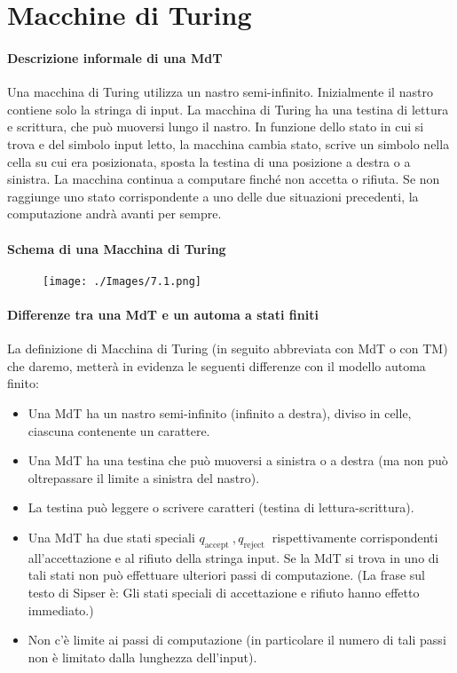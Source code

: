 \chapter{Macchine di Turing}

\subsubsection{Descrizione informale di una MdT}

Una macchina di Turing utilizza un nastro semi-infinito. Inizialmente il nastro contiene solo la stringa di input.
La macchina di Turing ha una testina di lettura e scrittura,
che può muoversi lungo il nastro.
In funzione dello stato in cui si trova e del simbolo input letto,
la macchina cambia stato, scrive un simbolo nella cella su cui
era posizionata, sposta la testina di una posizione a destra o a
sinistra.
La macchina continua a computare finché non accetta o
rifiuta.
Se non raggiunge uno stato corrispondente a uno delle due
situazioni precedenti, la computazione andrà avanti per
sempre.

\subsubsection{Schema di una Macchina di Turing}

\begin{figure}[hbpt!]
    \centering
    \texttt{[image: ./Images/7.1.png]}
\end{figure}
\FloatBarrier

\subsubsection{Differenze tra una MdT e un automa a stati finiti}
La definizione di Macchina di Turing (in seguito abbreviata con MdT o con TM) che daremo, metterà in evidenza le seguenti differenze con il modello automa finito:
\begin{itemize}
    \item  Una MdT ha un nastro semi-infinito (infinito a destra), diviso in celle, ciascuna contenente un carattere.
    \item Una MdT ha una testina che può muoversi a sinistra o a destra (ma non può oltrepassare il limite a sinistra del nastro).
    \item La testina può leggere o scrivere caratteri (testina di lettura-scrittura).
    \item Una MdT ha due stati speciali $q_{\text {accept }}, q_{\text {reject }}$ rispettivamente corrispondenti all'accettazione e al rifiuto della stringa input. Se la MdT si trova in uno di tali stati non può effettuare ulteriori passi di computazione. (La frase sul testo di Sipser è: Gli stati speciali di accettazione e rifiuto hanno effetto immediato.)
    \item Non c'è limite ai passi di computazione (in particolare il numero di tali passi non è limitato dalla lunghezza dell'input).
\end{itemize}

